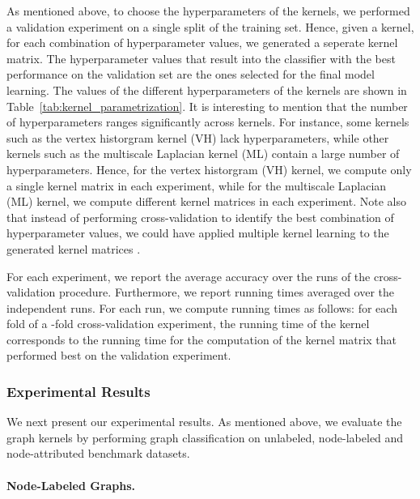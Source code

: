 \documentclass[twoside,11pt]{article}
\begin{document}
As mentioned above, to choose the hyperparameters of the kernels, we performed a validation experiment on a single  split of the training set.
Hence, given a kernel, for each combination of hyperparameter values, we generated a seperate kernel matrix.
The hyperparameter values that result into the classifier with the best performance on the validation set are the ones selected for the final model learning.
The values of the different hyperparameters of the kernels are shown in Table~\ref{tab:kernel_parametrization}.
It is interesting to mention that the number of hyperparameters ranges significantly across kernels.
For instance, some kernels such as the vertex historgram kernel (VH) lack hyperparameters, while other kernels such as the multiscale Laplacian kernel (ML) contain a large number of hyperparameters.
Hence, for the vertex historgram (VH) kernel, we compute only a single kernel matrix in each experiment, while for the multiscale Laplacian (ML) kernel, we compute  different kernel matrices in each experiment.
Note also that instead of performing cross-validation to identify the best combination of hyperparameter values, we could have applied multiple kernel learning to the generated kernel matrices .

For each experiment, we report the average accuracy over the  runs of the cross-validation procedure.
Furthermore, we report running times averaged over the  independent runs.
For each run, we compute running times as follows: for each fold of a -fold cross-validation experiment, the running time of the kernel corresponds to the running time for the computation of the kernel matrix that performed best on the validation experiment.


\subsubsection{Experimental Results}
We next present our experimental results.
As mentioned above, we evaluate the graph kernels by performing graph classification on unlabeled, node-labeled and node-attributed benchmark datasets.

\paragraph{Node-Labeled Graphs.}
\end{document}
